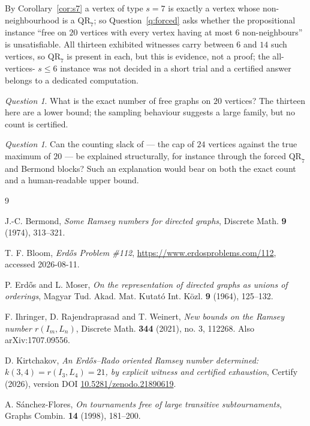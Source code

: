 \documentclass[11pt]{amsart}
\newcommand{\QR}{\mathrm{QR}_7}
\theoremstyle{plain}
\theoremstyle{definition}
\theoremstyle{remark}
\newtheorem{question}[theorem]{Question}
\begin{document}
By Corollary~\ref{cor:s7} a vertex of type $s=7$ is exactly a vertex
whose non-neighbourhood is a $\QR$; so Question~\ref{q:forced} asks
whether the propositional instance ``free on $20$ vertices with every
vertex having at most $6$ non-neighbours'' is unsatisfiable. All thirteen
exhibited witnesses carry between $6$ and $14$ such vertices, so $\QR$ is
present in each, but this is evidence, not a proof; the all-vertices-%
$s\le 6$ instance was not decided in a short trial and a certified answer
belongs to a dedicated computation.

\begin{question}
What is the exact number of free graphs on $20$ vertices? The thirteen
here are a lower bound; the sampling behaviour suggests a large family,
but no count is certified.
\end{question}

\begin{question}
Can the counting slack of \cite[\S8.1]{PartG} --- the cap of $24$ vertices
against the true maximum of $20$ --- be explained structurally, for
instance through the forced $\QR$ and Bermond blocks? Such an explanation
would bear on both the exact count and a human-readable upper bound.
\end{question}

\begin{thebibliography}{9}

 J.-C. Bermond, \emph{Some Ramsey numbers for directed
graphs}, Discrete Math. \textbf{9} (1974), 313--321.

 T. F. Bloom, \emph{Erd\H{o}s Problem \#112},
\url{https://www.erdosproblems.com/112}, accessed 2026-08-11.

 P. Erd\H{o}s and L. Moser, \emph{On the
representation of directed graphs as unions of orderings}, Magyar Tud.
Akad. Mat. Kutat\'o Int. K\"ozl. \textbf{9} (1964), 125--132.

 F. Ihringer, D. Rajendraprasad and T. Weinert,
\emph{New bounds on the Ramsey number $r(I_m,L_n)$}, Discrete Math.
\textbf{344} (2021), no. 3, 112268. Also arXiv:1707.09556.

 D. Kirtchakov, \emph{An Erd\H{o}s--Rado oriented Ramsey
number determined: $k(3,4)=r(I_3,L_4)=21$, by explicit witness and
certified exhaustion}, Certify (2026), version DOI
\href{https://doi.org/10.5281/zenodo.21890619}{10.5281/zenodo.21890619}.

 A. S\'anchez-Flores, \emph{On tournaments free
of large transitive subtournaments}, Graphs Combin. \textbf{14} (1998),
181--200.

\end{thebibliography}
\end{document}
